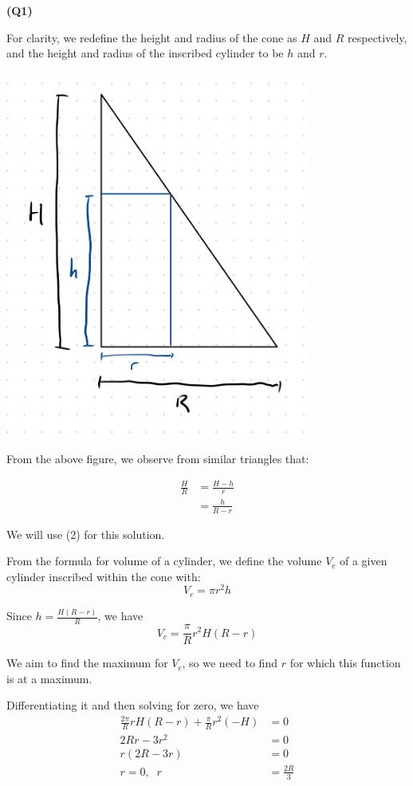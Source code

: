 \documentclass[12pt, a4paper]{article}
\begin{document}
\textbf{(Q1)}

For clarity, we redefine the height and radius of the cone as $H$ and $R$
respectively, and the height and radius of the inscribed cylinder to be $h$ and $r$.

\begin{center}
\includegraphics[width=10cm]{q1_cone.JPG}
\end{center}

From the above figure, we observe from similar triangles that:

\begin{align}
    \frac{H}{R} & = \frac{H - h}{r}\\ & = \frac{h}{R - r}
\end{align}

We will use (2) for this solution.

From the formula for volume of a cylinder, we define the volume $V_c$ of a
given cylinder inscribed within the cone with:
\[
    V_c = \pi r^2h
\]

Since $h = \frac{H(R - r)}{R}$, we have
\[
    V_c = \frac{\pi}{R}r^2 H(R - r)
\]

We aim to find the maximum for $V_c$, so we need to find $r$
for which this function is at a maximum.

\newpage

Differentiating it and then solving for zero, we have
\begin{align*}
    \frac{2\pi}{R}rH(R - r) + \frac{\pi}{R}r^2(-H) & = 0\\
    2Rr - 3r^2 & = 0\\
    r(2R - 3r) & = 0\\
    r = 0, \;\; r & = \frac{2R}{3}
\end{align*}
\end{document}
